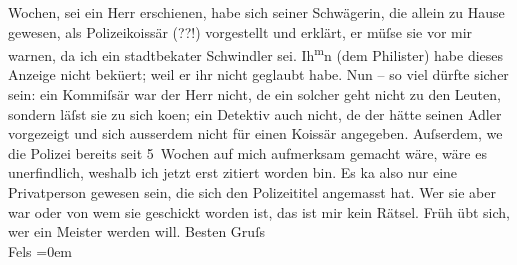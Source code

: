 \begin{ledgroupsized}[t]{13cm}
                    Wochen, sei ein Herr erschienen, habe sich seiner Schwägerin, die allein zu
                    Hause gewesen, als Polizeiko{\geminationm}issär (??!)
                    vorgestellt und erklärt, er müſse sie vor mir warnen, da ich ein stadtbeka{\geminationn}ter Schwindler sei. Ih\substVorne{}\textsuperscript{m}\substDazwischen{}n\substHinten{} (dem Philister)
                    habe dieses Anzeige nicht bekü{\geminationm}ert; weil er ihr
                    nicht geglaubt habe.\pend
           \pstart
           Nun – so viel dürfte sicher sein: ein Kommiſsär war der Herr nicht,
                        de{\geminationn} ein solcher geht nicht zu den Leuten,
                    sondern läſst sie zu sich ko{\geminationm}en; ein Detektiv auch
                    nicht, de{\geminationn} der {\pb}hätte seinen Adler vorgezeigt und sich ausserdem nicht für einen Ko{\geminationm}issär angegeben. Auſserdem, we{\geminationn} die Polizei bereits seit 5 Wochen auf mich
                    aufmerksam gemacht wäre, wäre es unerfindlich, weshalb ich jetzt erst zitiert
                    worden bin. Es ka{\geminationn} also nur eine Privatperson
                    gewesen sein, die sich den Polizeititel angemasst hat. Wer sie aber war oder von
                    wem sie geschickt worden ist, das ist mir kein Rätsel. Früh übt sich, wer ein
                    Meister werden will.\pend
           \pstart
           Besten Gruſs{\\[\baselineskip]}\spacefill\mbox{Fels}\pend
           \leftskip=0em{}\endnumbering{}\end{ledgroupsized}  \newcommand{\dateiname}{L00401}\newcommand{\titel}{Friedrich M. Fels an Arthur Schnitzler, [12. 11. 1894]}\newcommand{\editorInnen}{Martin Anton Müller und Gerd-Hermann Susen}
      